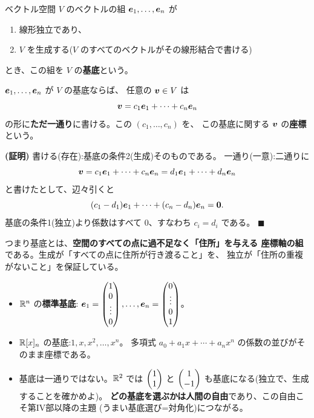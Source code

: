 \begin{teigi}[基底]
ベクトル空間 $V$ のベクトルの組 $\bm{e}_1, \dots, \bm{e}_n$ が
\begin{enumerate}
\item 線形独立であり、
\item $V$ を生成する($V$ のすべてのベクトルがその線形結合で書ける)
\end{enumerate}
とき、この組を $V$ の\textbf{基底}という。
\end{teigi}

\begin{teiri}[座標の一意性]\label{thm:coord-unique}
$\bm{e}_1, \dots, \bm{e}_n$ が $V$ の基底ならば、
任意の $\bm{v} \in V$ は
\[
\bm{v} = c_1 \bm{e}_1 + \cdots + c_n \bm{e}_n
\]
の形に\textbf{ただ一通り}に書ける。この $(c_1, \dots, c_n)$ を、
この基底に関する $\bm{v}$ の\textbf{座標}という。
\end{teiri}

\noindent\textbf{(証明)}\quad
書ける(存在):基底の条件2(生成)そのものである。
一通り(一意):二通りに
\[
\bm{v} = c_1 \bm{e}_1 + \cdots + c_n \bm{e}_n
= d_1 \bm{e}_1 + \cdots + d_n \bm{e}_n
\]
と書けたとして、辺々引くと
\[
(c_1 - d_1)\bm{e}_1 + \cdots + (c_n - d_n)\bm{e}_n = \bm{0}.
\]
基底の条件1(独立)より係数はすべて $0$、すなわち $c_i = d_i$ である。
$\blacksquare$

つまり基底とは、\textbf{空間のすべての点に過不足なく「住所」を与える
座標軸の組}である。生成が「すべての点に住所が行き渡ること」を、
独立が「住所の重複がないこと」を保証している。

\begin{rei}
\begin{itemize}
\item $\mathbb{R}^n$ の\textbf{標準基底}:
$\bm{e}_1 = \begin{pmatrix}1 \\ 0 \\ \vdots \\ 0\end{pmatrix}, \dots,
\bm{e}_n = \begin{pmatrix}0 \\ \vdots \\ 0 \\ 1\end{pmatrix}$。
\item $\mathbb{R}[x]_n$ の基底:$1, x, x^2, \dots, x^n$。
多項式 $a_0 + a_1 x + \cdots + a_n x^n$ の係数の並びがそのまま座標である。
\item 基底は一通りではない。$\mathbb{R}^2$ では
$\begin{pmatrix}1 \\ 1\end{pmatrix}$ と $\begin{pmatrix}1 \\ -1\end{pmatrix}$ も基底になる(独立で、生成することを確かめよ)。
\textbf{どの基底を選ぶかは人間の自由}であり、この自由こそ第IV部以降の主題
(うまい基底選び=対角化)につながる。
\end{itemize}
\end{rei}

